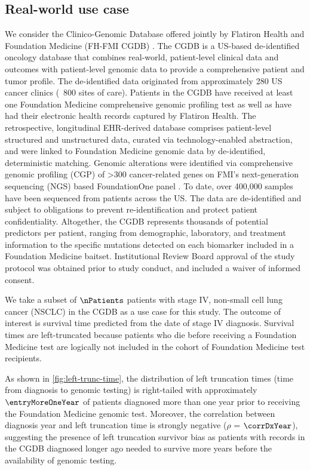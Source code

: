 \documentclass[11pt,final,fleqn]{article}\usepackage[]{graphicx}\usepackage[]{color}
\theoremstyle{plain}
\begin{document}
\subsection{Real-world use case}
We consider the Clinico-Genomic Database offered jointly by Flatiron Health and Foundation Medicine (FH-FMI CGDB) \cite{singal2017cgdb}. The CGDB is a US-based de-identified oncology database that combines real-world, patient-level clinical data and outcomes with patient-level genomic data to provide a comprehensive patient and tumor profile. The de-identified data originated from approximately 280 US cancer clinics (~800 sites of care). Patients in the CGDB have received at least one Foundation Medicine comprehensive genomic profiling test as well as have had their electronic health records captured by Flatiron Health. The retrospective, longitudinal EHR-derived database comprises patient-level structured and unstructured data, curated via technology-enabled abstraction, and were linked to Foundation Medicine genomic data by de-identified, deterministic matching. Genomic alterations were identified via comprehensive genomic profiling (CGP) of >300 cancer-related genes on FMI's next-generation sequencing (NGS) based FoundationOne panel \cite{birnbaum2020modelassisted, ma2020fmi}. To date, over 400,000 samples have been sequenced from patients across the US. The data are de-identified and subject to obligations to prevent re-identification and protect patient confidentiality. Altogether, the CGDB represents thousands of potential predictors per patient, ranging from demographic, laboratory, and treatment information to the specific mutations detected on each biomarker included in a Foundation Medicine baitset. Institutional Review Board approval of the study protocol was obtained prior to study conduct, and included a waiver of informed consent.

We take a subset of $\nPatients$ patients with stage IV, non-small cell lung cancer (NSCLC) in the CGDB as a use case for this study. The outcome of interest is survival time predicted from the date of stage IV diagnosis. Survival times are left-truncated because patients who die before receiving a Foundation Medicine test are logically not included in the cohort of Foundation Medicine test recipients. 

As shown in \autoref{fig:left-trunc-time}, the distribution of left truncation times (time from diagnosis to genomic testing) is right-tailed with approximately $\entryMoreOneYear$ of patients diagnosed more than one year prior to receiving the Foundation Medicine genomic test.  Moreover, the correlation between diagnosis year and left truncation time is strongly negative ({$\rho$} = $\corrDxYear$), suggesting the presence of left truncation survivor bias as patients with records in the CGDB diagnosed longer ago needed to survive more years before the availability of genomic testing. 
\end{document}
